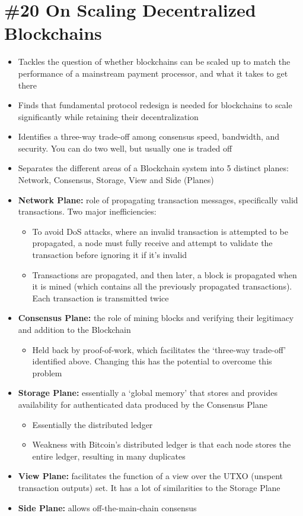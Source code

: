 \section{\#20 On Scaling Decentralized Blockchains}
\begin{itemize}
	\item Tackles the question of whether blockchains can be scaled up to match the performance of a mainstream payment processor, and what it takes to get there
	\item Finds that fundamental protocol redesign is needed for blockchains to scale significantly while retaining their decentralization
	\item Identifies a three-way trade-off among consensus speed, bandwidth, and security. You can do two well, but usually one is traded off
	\item Separates the different areas of a Blockchain system into 5 distinct planes: Network, Consensus, Storage, View and Side (Planes)
	\item \textbf{Network Plane:} role of propagating transaction messages, specifically valid transactions. Two major inefficiencies:
	\begin{itemize}
		\item To avoid DoS attacks, where an invalid transaction is attempted to be propagated, a node must fully receive and attempt to validate the transaction before ignoring it if it's invalid
		\item Transactions are propagated, and then later, a block is propagated when it is mined (which contains all the previously propagated transactions). Each transaction is transmitted twice
	\end{itemize}
	\item \textbf{Consensus Plane:} the role of mining blocks and verifying their legitimacy and addition to the Blockchain
	\begin{itemize}
		\item Held back by proof-of-work, which facilitates the `three-way trade-off' identified above. Changing this has the potential to overcome this problem
	\end{itemize}
	\item \textbf{Storage Plane:} essentially a `global memory' that stores and provides availability for authenticated data produced by the Consensus Plane
	\begin{itemize}
		\item Essentially the distributed ledger
		\item Weakness with Bitcoin's distributed ledger is that each node stores the entire ledger, resulting in many duplicates
	\end{itemize}
	\item\textbf{View Plane:} facilitates the function of a view over the UTXO (unspent transaction outputs) set. It has a lot of similarities to the Storage Plane
	\item\textbf{Side Plane:} allows off-the-main-chain consensus
\end{itemize}